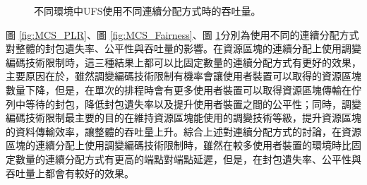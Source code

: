 \begin{figure}[H]
\centering
{}
\caption{\label{fig:MCS_Throughput}不同環境中UFS使用不同連續分配方式時的吞吐量。}
\end{figure}
圖 \ref{fig:MCS_PLR}、圖 \ref{fig:MCS_Fairness}、圖 \ref{fig:MCS_Throughput}分別為使用不同的連續分配方式對整體的封包遺失率、公平性與吞吐量的影響。在資源區塊的連續分配上使用調變編碼技術限制時，這三種結果上都可以比固定數量的連續分配方式有更好的效果，主要原因在於，雖然調變編碼技術限制有機率會讓使用者裝置可以取得的資源區塊數量下降，但是，在單次的排程時會有更多使用者裝置可以取得資源區塊傳輸在佇列中等待的封包，降低封包遺失率以及提升使用者裝置之間的公平性；同時，調變編碼技術限制最主要的目的在維持資源區塊能使用的調變技術等級，提升資源區塊的資料傳輸效率，讓整體的吞吐量上升。綜合上述對連續分配方式的討論，在資源區塊的連續分配上使用調變編碼技術限制時，雖然在較多使用者裝置的環境時比固定數量的連續分配方式有更高的端點對端點延遲，但是，在封包遺失率、公平性與吞吐量上都會有較好的效果。

